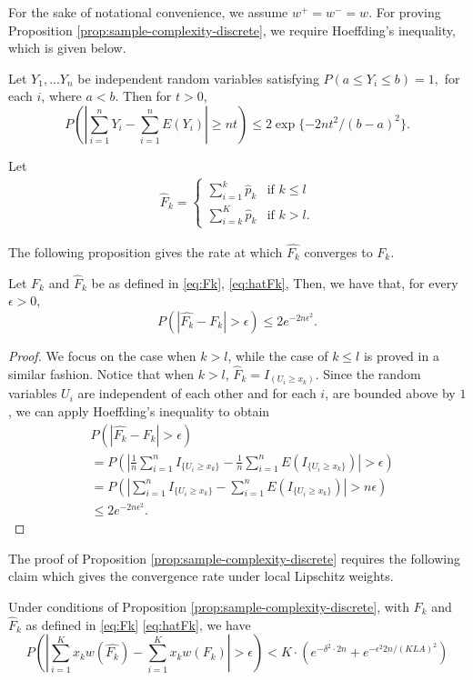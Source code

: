 For the sake of notational convenience, we assume $w^+=w^-=w$. 
For proving Proposition \ref{prop:sample-complexity-discrete}, we require Hoeffding's inequality, which is given below.
\begin{lemma}
Let $Y_1,...Y_n$ be independent random variables satisfying $P(a\leq Y_i \leq b)= 1,$ for each $i$, where $a<b.
$ Then for $t>0$,
$$P(\left|\sum_{i=1}^n Y_i -\sum_{i=1}^n E(Y_i)\right| \geq nt ) \leq 2\exp{\{-2nt^2 /(b-a)^2\}}. $$
\end{lemma}


Let
\begin{align}
\label{eq:hatFk}
\hat F_k = 
\begin{cases}
   \sum_{i=1}^k \hat p_k & \text{if   } k \leq l \\
   \sum_{i=k}^K \hat p_k & \text{if  }  k > l.
\end{cases}  
\end{align}

The following proposition gives the rate at which $\hat{F_k}$ converges to $F_k$.
\begin{proposition}
\label{prop:hoeffding-discrete}
Let $F_k$ and $\hat F_k$ be as defined in \eqref{eq:Fk}, \eqref{eq:hatFk}, Then, we have that, for every $\epsilon >0$, 
$$P(|\hat{F_k}-F_k| > \epsilon) \leq 2 e^{-2n \epsilon^2}.$$
\end{proposition}
\begin{proof}
We focus on the case when $k > l$, while the case of $k \leq l$ is proved in a similar fashion.
Notice that when $k>l$,  $\hat F_k =I_{(U_i \geq  x_k) }$. Since the random variables $U_i$ are independent of each other and  for each $i$, are bounded above by $1$, we can apply Hoeffding's inequality to obtain 
\begin{align*}
&
P(\left|\hat{F_k}- F_k \right| > \epsilon) \\ & = P(\left| \frac{1}{n} \sum_{i=1}^n I_{\{U_i \geq
x_k\}} - \frac{1}{n} \sum_{i=1}^n E(I_{\{U_i \geq x_k\}}) \right| > \epsilon) \\ & = P(\left|
\sum_{i=1}^n I_{\{U_i \geq x_k\}} - \sum_{i=1}^n E(I_{\{U_i \geq x_k\}}) \right| > n\epsilon) \\ &
    \leq 2e^{-2n \epsilon^2}.
\end{align*}
\end{proof}

The proof of Proposition \ref{prop:sample-complexity-discrete} requires the following claim which gives the convergence rate under local Lipschitz weights. 
\begin{proposition}
\label{prop:discrete-first-term}
Under conditions of Proposition \ref{prop:sample-complexity-discrete}, with $F_k$ and $\hat F_k$ as defined in \eqref{eq:Fk} \eqref{eq:hatFk},  we have
$$P(\left| \sum_{i=1}^K x_k w(\hat{F_k}) - \sum_{i=1}^K x_k w(F_k) \right| >\epsilon) < K\cdot (
e^{-\delta^2\cdot 2n} + e^{-\epsilon^2 2n/(KLA)^2}) $$ 
\end{proposition}

